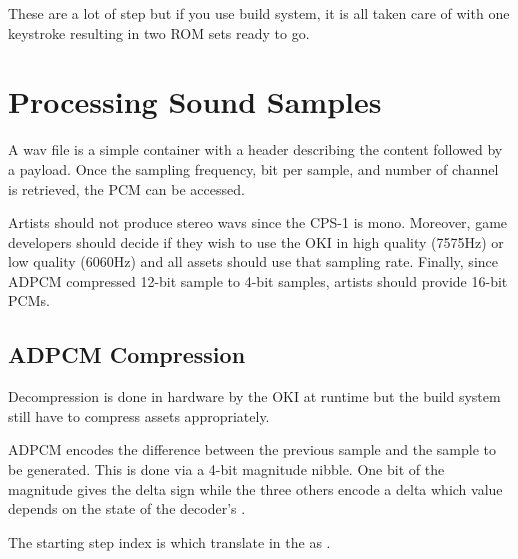 \begin{trivia}
These are a lot of step but if you use  build system, it is all taken care of with one keystroke resulting in two ROM sets ready to go.
\end{trivia}






\section{Processing Sound Samples}
A wav file is a simple container with a header describing the content followed by a payload. Once the sampling frequency, bit per sample, and number of channel is retrieved, the PCM can be accessed.

Artists should not produce stereo wavs since the CPS-1 is mono. Moreover, game developers should decide if they wish to use the OKI in high quality (7575Hz) or low quality (6060Hz) and all assets should use that sampling rate. Finally, since ADPCM compressed 12-bit sample to 4-bit samples, artists should provide 16-bit PCMs.


\subsection{ADPCM Compression}
Decompression is done in hardware by the OKI at runtime but the build system still have to compress assets appropriately. 


ADPCM encodes the difference between the previous sample and the sample to be generated. This is done via a 4-bit magnitude nibble. One bit of the magnitude gives the delta sign while the three others encode a delta which value depends on the state of the decoder's .





The starting step index is  which translate in the  as .

